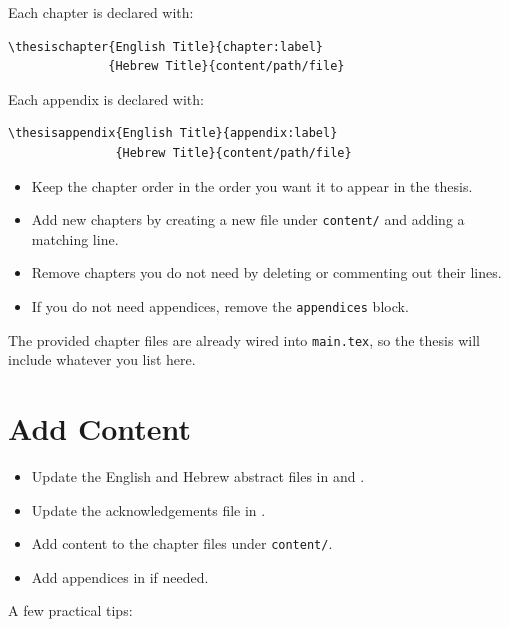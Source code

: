 \documentclass[11pt,a4paper]{article}
\begin{document}
Each chapter is declared with:
\begin{verbatim}
\thesischapter{English Title}{chapter:label}
              {Hebrew Title}{content/path/file}
\end{verbatim}

Each appendix is declared with:
\begin{verbatim}
\thesisappendix{English Title}{appendix:label}
               {Hebrew Title}{content/path/file}
\end{verbatim}

\begin{itemize}[leftmargin=*]
    \item Keep the chapter order in the order you want it to appear in the thesis.
    \item Add new chapters by creating a new file under \texttt{content/} and adding a matching \texttt{\string\thesischapter} line.
    \item Remove chapters you do not need by deleting or commenting out their lines.
    \item If you do not need appendices, remove the \texttt{appendices} block.
\end{itemize}

The provided chapter files are already wired into \texttt{main.tex}, so the thesis will include whatever you list here.

\section{Add Content}
\begin{itemize}[leftmargin=*]
    \item Update the English and Hebrew abstract files in  and .
    \item Update the acknowledgements file in .
    \item Add content to the chapter files under \texttt{content/}.
    \item Add appendices in  if needed.
\end{itemize}

A few practical tips:
\end{document}
